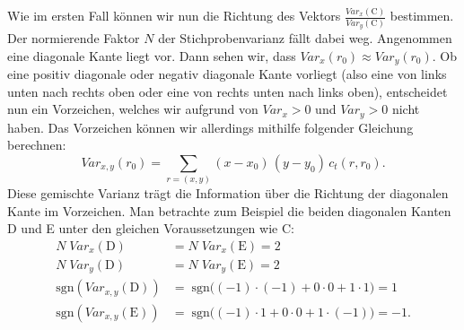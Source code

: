 \documentclass[a4paper, 11pt]{report}
\theoremstyle{definition}
\begin{document}
 			Wie im ersten Fall können wir nun die Richtung des Vektors $\frac{Var_x(\text{C})}{Var_y(\text{C})}$ bestimmen. Der normierende Faktor $N$ der Stichprobenvarianz fällt dabei weg. Angenommen eine diagonale Kante liegt vor.
 			Dann sehen wir, dass $Var_x(r_0) \approx Var_y(r_0)$. Ob eine \glqq positiv diagonale\grqq{} oder \glqq negativ diagonale\grqq{} Kante vorliegt (also eine von links unten nach rechts oben oder eine von rechts unten nach links oben), entscheidet nun ein Vorzeichen, welches wir aufgrund von $Var_x > 0$ und $Var_y > 0$ nicht haben.
 			Das Vorzeichen können wir allerdings mithilfe folgender Gleichung berechnen:
 			$$ Var_{x,y}(r_0) = \sum_{r=(x,y)} (x-x_0) \, (y-y_0) \, c_t(r,r_0).$$
 			Diese \glqq gemischte Varianz\grqq{} trägt die Information über die Richtung der diagonalen Kante im Vorzeichen.
 			Man betrachte zum Beispiel die beiden diagonalen Kanten D und E unter den gleichen Voraussetzungen wie C:
 			 \begin{align*}
 				N \; Var_x(\text{D}) &= N \; Var_x(\text{E}) = 2 \\
 				N \; Var_y(\text{D}) &= N \; Var_y(\text{E}) = 2 \\
 				\text{sgn}(Var_{x,y}(\text{D})) 	&=\;\text{sgn}\bigg((-1) \cdot (-1)+ 0 \cdot 0 +1 \cdot 1\bigg) = 1\\
 				\text{sgn}(Var_{x,y}(\text{E}))		&=\;\text{sgn}\bigg((-1) \cdot 1+ 0 \cdot 0 +1 \cdot (-1)\bigg) = -1.\\
 			\end{align*}
 			
\end{document}
